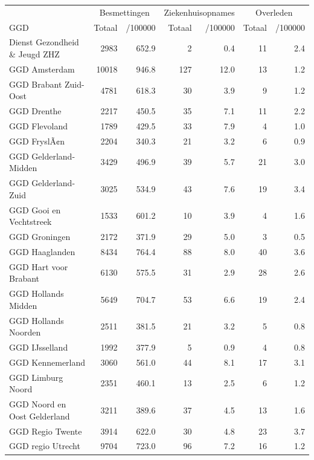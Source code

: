 \documentclass[
  english,
  man,floatsintext]{apa6}
\begin{document}
\begin{table}[H]
\centering\begingroup\fontsize{10}{12}\selectfont

\begin{threeparttable}
\begin{tabular}{lrrrrrr}
\toprule
\multicolumn{1}{c}{ } & \multicolumn{2}{c}{Besmettingen} & \multicolumn{2}{c}{Ziekenhuisopnames} & \multicolumn{2}{c}{Overleden} \\
\cmidrule(l{3pt}r{3pt}){2-3} \cmidrule(l{3pt}r{3pt}){4-5} \cmidrule(l{3pt}r{3pt}){6-7}
GGD & Totaal & /100000 & Totaal & /100000 & Totaal & /100000\\
\midrule
Dienst Gezondheid \& Jeugd ZHZ & 2983 & 652.9 & 2 & 0.4 & 11 & 2.4\\
GGD Amsterdam & 10018 & 946.8 & 127 & 12.0 & 13 & 1.2\\
GGD Brabant Zuid-Oost & 4781 & 618.3 & 30 & 3.9 & 9 & 1.2\\
GGD Drenthe & 2217 & 450.5 & 35 & 7.1 & 11 & 2.2\\
GGD Flevoland & 1789 & 429.5 & 33 & 7.9 & 4 & 1.0\\
GGD FryslÃ¢n & 2204 & 340.3 & 21 & 3.2 & 6 & 0.9\\
GGD Gelderland-Midden & 3429 & 496.9 & 39 & 5.7 & 21 & 3.0\\
GGD Gelderland-Zuid & 3025 & 534.9 & 43 & 7.6 & 19 & 3.4\\
GGD Gooi en Vechtstreek & 1533 & 601.2 & 10 & 3.9 & 4 & 1.6\\
GGD Groningen & 2172 & 371.9 & 29 & 5.0 & 3 & 0.5\\
GGD Haaglanden & 8434 & 764.4 & 88 & 8.0 & 40 & 3.6\\
GGD Hart voor Brabant & 6130 & 575.5 & 31 & 2.9 & 28 & 2.6\\
GGD Hollands Midden & 5649 & 704.7 & 53 & 6.6 & 19 & 2.4\\
GGD Hollands Noorden & 2511 & 381.5 & 21 & 3.2 & 5 & 0.8\\
GGD IJsselland & 1992 & 377.9 & 5 & 0.9 & 4 & 0.8\\
GGD Kennemerland & 3060 & 561.0 & 44 & 8.1 & 17 & 3.1\\
GGD Limburg Noord & 2351 & 460.1 & 13 & 2.5 & 6 & 1.2\\
GGD Noord en Oost Gelderland & 3211 & 389.6 & 37 & 4.5 & 13 & 1.6\\
GGD Regio Twente & 3914 & 622.0 & 30 & 4.8 & 23 & 3.7\\
GGD regio Utrecht & 9704 & 723.0 & 96 & 7.2 & 16 & 1.2\\

\end{tabular}
\end{threeparttable}
\end{table}
\end{document}
